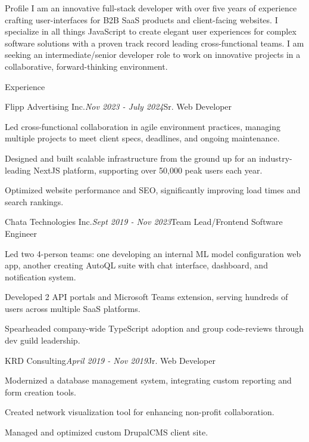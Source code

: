 \documentclass{resume}
\begin{document}
\begin{rSection}{Profile}
  I am an innovative full-stack developer with over five years of experience crafting user-interfaces for B2B SaaS products 
  and client-facing websites. I specialize in all things JavaScript to create elegant user experiences for complex software 
  solutions with a proven track record leading cross-functional teams. I am seeking an intermediate/senior developer role 
  to work on innovative projects in  a collaborative, forward-thinking environment.
\end{rSection}


\begin{rSection}{Experience}

    \begin{rSubsection}{Flipp Advertising Inc.}{\em Nov 2023 - July 2024}{Sr. Web Developer}{}
      \item Led cross-functional collaboration in agile environment practices, managing multiple projects to meet client specs, deadlines, and ongoing maintenance.
      \item Designed and built scalable infrastructure from the ground up for an industry-leading NextJS platform, supporting over 50,000 peak users each year.
      \item Optimized website performance and SEO, significantly improving load times and search rankings.
    \end{rSubsection}
    \begin{rSubsection}{Chata Technologies Inc.}{\em Sept 2019 - Nov 2023}{Team Lead/Frontend Software Engineer}{}
      \item Led two 4-person teams: one developing an internal ML model configuration web app, another creating AutoQL suite with chat interface, dashboard, and notification system.
      \item Developed 2 API portals and Microsoft Teams extension, serving hundreds of users across multiple SaaS platforms.
      \item Spearheaded company-wide TypeScript adoption and group code-reviews through dev guild leadership.
    \end{rSubsection}
    \begin{rSubsection}{KRD Consulting}{\em April 2019 - Nov 2019}{Jr. Web Developer}{}
      \item Modernized a database management system, integrating custom reporting and form creation tools.
      \item Created network visualization tool for enhancing non-profit collaboration.
      \item Managed and optimized custom DrupalCMS client site.
    \end{rSubsection}
    
\end{rSection}
\end{document}

